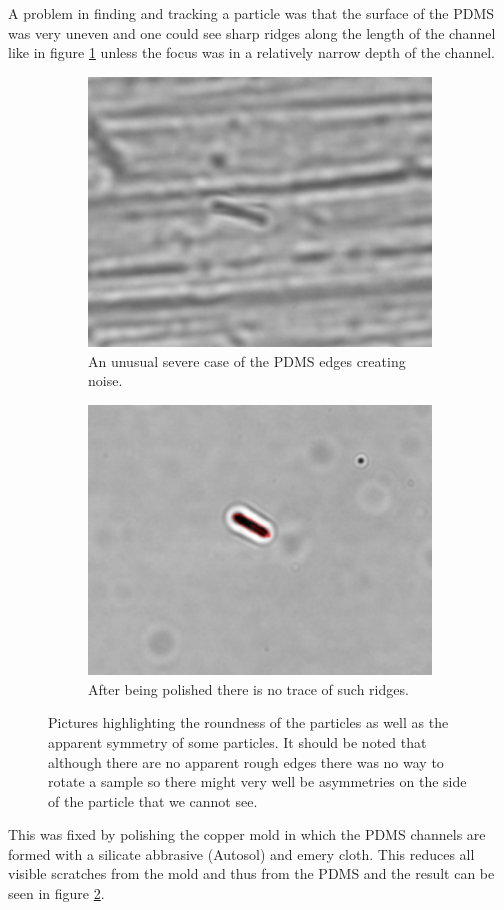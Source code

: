 A problem in finding and tracking a particle was that the surface of the PDMS was very uneven and one could see sharp ridges along the length of the channel like in figure \ref{fig:unpolished} unless the focus was in a relatively narrow depth of the channel. 
 
 \begin{figure}[H]
 \centering
 \begin{subfigure}[3a]{0.40\textwidth}
 \includegraphics[width=\textwidth]{figures/improvements/unpolished.png}
 \caption{An unusual severe case of the PDMS edges creating noise.}\label{fig:unpolished}
 \end{subfigure}\hspace{1em}%
 \begin{subfigure}[3b]{0.40\textwidth}
 \includegraphics[width=\textwidth]{figures/improvements/polished.png}
 \caption{After being polished there is no trace of such ridges.}\label{fig:polished}
 \end{subfigure}
 \caption{Pictures highlighting the roundness of the particles as well as the apparent symmetry of some particles. It should be noted that although there are no apparent rough edges there was no way to rotate a sample so there might very well be asymmetries on the side of the particle that we cannot see.}
 \label{fig:polisheffect}
 \end{figure}
 

This was fixed by polishing the copper mold in which the PDMS channels are formed with a silicate abbrasive (Autosol) and emery cloth. This reduces all visible scratches from the mold and thus from the PDMS and the result can be seen in figure \ref{fig:polished}.

